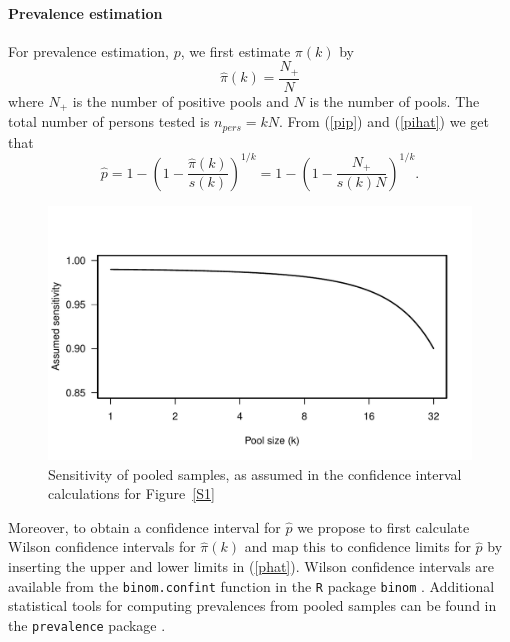 \documentclass[10pt]{article}
\begin{document}
\paragraph*{Prevalence estimation}
For prevalence estimation, $p$,  we first  estimate $\pi(k)$ by 
\begin{equation}
\label{pihat}
\hat{\pi}(k)=\frac{N_{+}}{N}
\end{equation}
where $N_{+}$  is the number of positive pools and $N$ is the number of pools.  The total number of persons tested is $n_{pers}=kN$. From (\ref{pip})  and (\ref{pihat}) we get that 
\begin{equation}
\label{phat}
\hat{p}=1-\left(1-\frac{\hat{\pi}(k)}{s(k)}\right)^{1/k}=1-\left(1-\frac{N_+}{s(k)N}\right)^{1/k}.
\end{equation}
\begin{figure}[!hbt]
\begin{center}
\includegraphics[width=0.85\linewidth]{sens_assumed.pdf}
\end{center}
\caption{Sensitivity of pooled samples, as assumed in the confidence interval calculations for Figure~\ref{S1}}
\label{S3}
\end{figure}
Moreover, to obtain a confidence interval for $\hat p$ we propose to first calculate Wilson confidence intervals \citep{agresti_approximate_1998} for $\hat{\pi}(k)$ and map this to confidence limits for $\hat p$ by inserting the upper and lower limits in (\ref{phat}). Wilson confidence intervals are available from the {\tt binom.confint} function in the {\tt R} package {\tt binom} \citep{R,binom}. Additional statistical tools for computing prevalences from pooled samples can be found in the {\tt prevalence} package \citep{prevalence,speybroeck_estimating_2012}.
\end{document}
